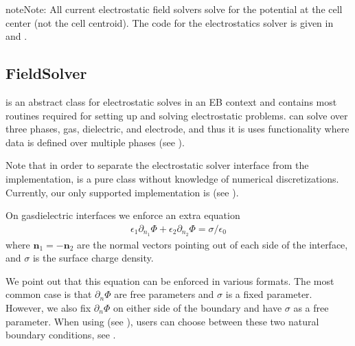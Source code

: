 \documentclass[letterpaper,10pt,english]{sphinxmanual}
\begin{document}
\begin{sphinxadmonition}{note}{Note:}
All current electrostatic field solvers solve for the potential at the cell center (not the cell centroid).
The code for the electrostatics solver is given in  and .
\end{sphinxadmonition}


\subsection{FieldSolver}
\label{\detokenize{Solvers/Electrostatics:fieldsolver}}
 is an abstract class for electrostatic solves in an EB context and contains most routines required for setting up and solving electrostatic problems.
 can solve over three phases, gas, dielectric, and electrode, and thus it is uses  functionality where data is defined over multiple phases (see {\hyperref[\detokenize{Source/MeshData:chap-meshdata}]{}}).

Note that in order to separate the electrostatic solver interface from the implementation,  is a pure class without knowledge of numerical discretizations.
Currently, our only supported implementation is  (see {\hyperref[\detokenize{Solvers/Electrostatics:chap-fieldsolvermultigrid}]{}}).

On gas\sphinxhyphen{}dielectric interfaces we enforce an extra equation
\begin{equation}\label{equation:Solvers/Electrostatics:GaussBC}
\begin{split}\epsilon_1\partial_{n_1}\Phi + \epsilon_2\partial_{n_2}\Phi = \sigma/\epsilon_0\end{split}
\end{equation}
where \(\mathbf{n}_1 = -\mathbf{n}_2\) are the normal vectors pointing out of each side of the interface, and \(\sigma\) is the surface charge density.

We point out that this equation can be enforced in various formats.
The most common case is that \(\partial_n\Phi\) are free parameters and \(\sigma\) is a fixed parameter.
However, we  also fix \(\partial_n\Phi\) on either side of the boundary and have \(\sigma\) as a free parameter.
When using  (see {\hyperref[\detokenize{Solvers/Electrostatics:chap-fieldsolvermultigrid}]{}}), users can choose between these two natural boundary conditions, see {\hyperref[\detokenize{Solvers/Electrostatics:chap-poissonebbc}]{}}.
\end{document}
